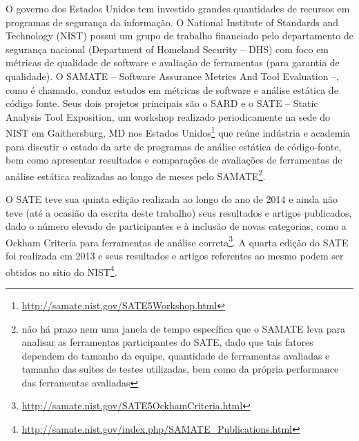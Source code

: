   O governo dos Estados Unidos tem investido grandes quantidades de recursos em programas de segurança da informação. O National Institute of Standards and Technology (NIST) possui um grupo de trabalho financiado pelo departamento de segurança nacional (Department of Homeland Security – DHS) com foco em métricas de qualidade de software e avaliação de ferramentas (para garantia de qualidade). O SAMATE – Software Assurance Metrics And Tool Evaluation –, como é chamado, conduz estudos em métricas de software e análise estática de código fonte. Seus dois projetos principais são o SARD e o SATE – Static Analysis Tool Exposition, um workshop realizado periodicamente na sede do NIST em Gaithersburg, MD nos Estados Unidos\footnote{\url{http://samate.nist.gov/SATE5Workshop.html}} que reúne indústria e academia para discutir o estado da arte de programas de análise estática de código-fonte, bem como apresentar resultados e comparações de avaliações de ferramentas de análise estática realizadas ao longo de meses pelo SAMATE\footnote{não há prazo nem uma janela de tempo específica que o SAMATE leva para analisar as ferramentas participantes do SATE, dado que tais fatores dependem do tamanho da equipe, quantidade de ferramentas avaliadas e tamanho das suítes de testes utilizadas, bem como da própria performance das ferramentas avaliadas}.

  O SATE teve sua quinta edição realizada ao longo do ano de 2014 e ainda não teve (até a ocasião da escrita deste trabalho) seus resultados e artigos publicados, dado o número elevado de participantes e à inclusão de novas categorias, como a Ockham Criteria para ferramentas de análise correta\footnote{\url{http://samate.nist.gov/SATE5OckhamCriteria.html}}. A quarta edição do SATE foi realizada em 2013 e seus resultados e artigos referentes ao mesmo podem ser obtidos no sítio do NIST\footnote{\url{http://samate.nist.gov/index.php/SAMATE_Publications.html}}.


